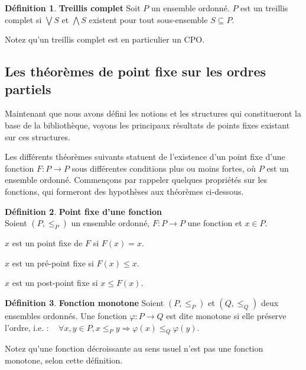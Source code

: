 \documentclass{article}
\newcommand{\yz}[1]{\textcolor{blue}{{[YZ:~#1]}}}
\theoremstyle{definition}
\newtheorem{definition}{Définition}[section]
\begin{document}
\begin{definition}{\textbf{Treillis complet}}
Soit $P$ un ensemble ordonné. $P$ est un treillis complet si $\bigvee S$ et $\bigwedge S$ existent pour tout sous-ensemble $S \subseteq P$.

\end{definition}
Notez qu'un treillis complet est en particulier un CPO.

\subsection{Les théorèmes de point fixe sur les ordres partiels}

Maintenant que nous avons défini les notions et les structures qui constitueront la base de la bibliothèque, voyons les principaux résultats de points fixes existant sur ces structures.

Les différents théorèmes suivants statuent de l'existence d'un point fixe d'une fonction $F : P \rightarrow P$ sous différentes conditions plus ou moins fortes, où $P$ est un ensemble ordonné. Commençons par rappeler quelques propriétés sur les fonctions, qui formeront des hypothèses aux théorèmes ci-dessous.

\begin{definition}{\textbf{Point fixe d'une fonction\\}}
\label{fixpoint-def}
Soient $(P, \leq_P)$ un ensemble ordonné, $F : P \rightarrow P$ une fonction et $x \in P$. 

$x$ est un point fixe de $F$ si $F(x) = x$.

$x$ est un pré-point fixe si $F(x) \leq x$.

$x$ est un post-point fixe si $x \leq F(x)$.
\end{definition}

\begin{definition}{\textbf{Fonction monotone}}
Soient $(P, \leq_P)$ et $(Q, \leq_Q)$ deux ensembles ordonnés. Une fonction $\varphi : P \rightarrow Q$ est dite monotone si elle préserve l'ordre, i.e. : ~ $\forall x, y \in P, x \leq_P y \Longrightarrow \varphi(x) \leq_Q \varphi(y)$.

Notez qu'une fonction décroissante au sens usuel n'est pas une fonction monotone, selon cette définition.
\end{definition}
\end{document}
